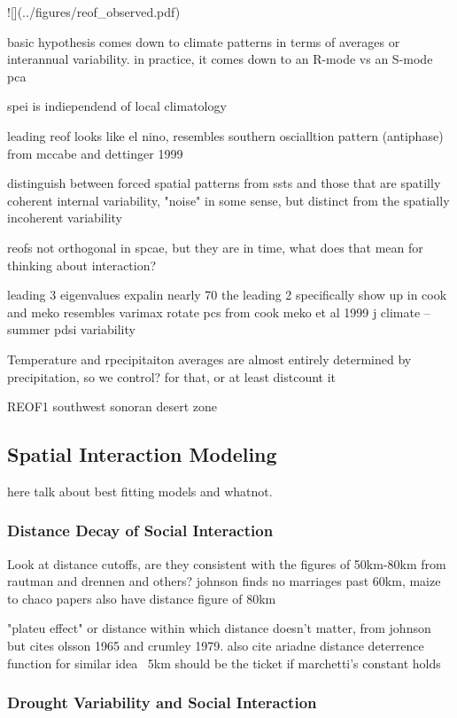 \documentclass[fleqn,10pt]{wlscirep}
\begin{document}
![](../figures/reof_observed.pdf)

basic hypothesis comes down to climate patterns in terms of averages or interannual variability. in practice, it comes down to an R-mode vs an S-mode pca

spei is indiependend of local climatology

leading reof looks like el nino, resembles southern oscialltion pattern (antiphase) from mccabe and dettinger 1999

distinguish between forced spatial patterns from ssts and those that are spatilly coherent internal variability, "noise" in some sense, but distinct from the spatially incoherent variability

reofs not orthogonal in spcae, but they are in time, what does that mean for thinking about interaction?

leading 3 eigenvalues expalin nearly 70%
the leading 2 specifically show up  in cook and meko
resembles varimax rotate pcs from cook meko et al 1999 j climate -- summer pdsi variability

Temperature and rpecipitaiton averages are almost entirely determined by precipitation, so we control? for that, or at least distcount it

REOF1 southwest sonoran desert zone

\subsection*{Spatial Interaction Modeling}

here talk about best fitting models and whatnot.

\subsubsection*{Distance Decay of Social Interaction}

Look at distance cutoffs, are they consistent with the figures of 50km-80km from rautman and drennen and others? johnson finds no marriages past 60km, maize to chaco papers also have distance figure of 80km

"plateu effect" or distance within which distance doesn't matter, from johnson but cites olsson 1965 and crumley 1979. also cite ariadne distance deterrence function for similar idea
~5km should be the ticket if marchetti's constant holds

\subsubsection*{Drought Variability and Social Interaction}
\end{document}
